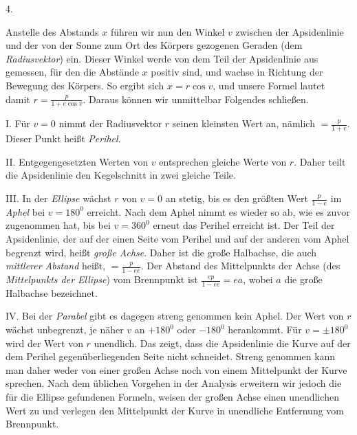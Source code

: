 \par{}
\begin{center}
4.
\end{center}
Anstelle des Abstands $x$ führen wir nun den Winkel $v$ zwischen der Apsidenlinie und der von der Sonne zum Ort des Körpers gezogenen Geraden (dem \emph{Radiusvektor}) ein. Dieser Winkel werde von dem Teil der Apsidenlinie aus gemessen, für den die Abstände $x$ positiv sind, und wachse in Richtung der Bewegung des Körpers. So ergibt sich $x=r\cos v$, und unsere Formel lautet damit $r=\frac{p}{1+e\cos v}$. Daraus können wir unmittelbar Folgendes schließen.

I. Für $v=0$ nimmt der Radiusvektor $r$ seinen kleinsten Wert an, nämlich $=\frac{p}{1+e}$. Dieser Punkt heißt \emph{Perihel}.

II. Entgegengesetzten Werten von $v$ entsprechen gleiche Werte von $r$. Daher teilt die Apsidenlinie den Kegelschnitt in zwei gleiche Teile.

III. In der \emph{Ellipse} wächst $r$ von $v=0$ an stetig, bis es den größten Wert $\frac{p}{1-e}$ im \emph{Aphel} bei $v=180^{0}$ erreicht. Nach dem Aphel nimmt es wieder so ab, wie es zuvor zugenommen hat, bis bei $v=360^{0}$ erneut das Perihel erreicht ist. Der Teil der Apsidenlinie, der auf der einen Seite vom Perihel und auf der anderen vom Aphel begrenzt wird, heißt \emph{große Achse}. Daher ist die große Halbachse, die auch \emph{mittlerer Abstand} heißt, $=\frac{p}{1-ee}$. Der Abstand des Mittelpunkts der Achse (des \emph{Mittelpunkts der Ellipse}) vom Brennpunkt ist $\frac{ep}{1-ee}=ea$, wobei $a$ die große Halbachse bezeichnet.

IV. Bei der \emph{Parabel} gibt es dagegen streng genommen kein Aphel. Der Wert von $r$ wächst unbegrenzt, je näher $v$ an $+180^{0}$ oder $-180^{0}$ herankommt. Für $v=\pm180^{0}$ wird der Wert von $r$ unendlich. Das zeigt, dass die Apsidenlinie die Kurve auf der dem Perihel gegenüberliegenden Seite nicht schneidet. Streng genommen kann man daher weder von einer großen Achse noch von einem Mittelpunkt der Kurve sprechen. Nach dem üblichen Vorgehen in der Analysis erweitern wir jedoch die für die Ellipse gefundenen Formeln, weisen der großen Achse einen unendlichen Wert zu und verlegen den Mittelpunkt der Kurve in unendliche Entfernung vom Brennpunkt.

